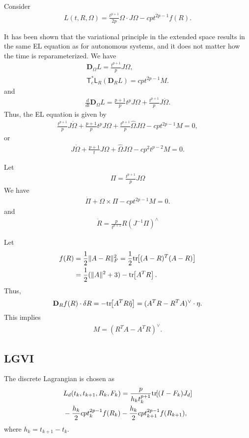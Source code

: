 \documentclass[letterpaper, 10pt, conference]{ieeeconf}
\newcommand{\bracket}[1]{\ensuremath{\left[ #1 \right]}}
\newcommand{\tr}[1]{\mbox{tr}\ensuremath{\negthickspace\bracket{#1}}}
\newcommand{\T}{\ensuremath{\mathsf{T}}}
\renewcommand{\L}{\ensuremath{\mathsf{L}}}
\newcommand{\D}{\ensuremath{\mathbf{D}}}
\begin{document}
Consider
\begin{align*}
    L(t,R,\Omega) = \frac{t^{p+1}}{2p} \Omega\cdot J\Omega - cpt^{2p-1} f(R).
\end{align*}

It has been shown that the variational principle in the extended space results in the same EL equation as for autonomous systems, and it does not matter how the time is reparameterized. 
We have
\begin{align*}
    \D_\Omega L = \frac{t^{p+1}}{p} J\Omega,\\
    \T^*_e \L_R( \D_R L) = cpt^{2p-1} M.
\end{align*}
and
\begin{align*}
    \frac{d}{dt} \D_\Omega L = \frac{p+1}{p} t^p J\Omega + \frac{t^{p+1}}{p} J\dot\Omega.
\end{align*}
Thus, the EL equation is given by
\begin{align*}
    \frac{t^{p+1}}{p} J\dot\Omega + \frac{p+1}{p} t^p J\Omega + \frac{t^{p+1}}{p} \hat\Omega J\Omega - cpt^{2p-1} M = 0,
\end{align*}
or
\begin{align*}
    J\dot\Omega + \frac{p+1}{t} J\Omega + \hat\Omega J\Omega - c p^2 t^{p-2} M = 0.
\end{align*}

Let
\begin{align*}
\Pi = \frac{t^{p+1}}{p} J\Omega
\end{align*}
We have
\begin{align*}
    \dot \Pi + \Omega\times \Pi - cpt^{2p-1} M = 0.
\end{align*}
and
\begin{align*}
    \dot R = \frac{p}{t^{p+1}} R (J^{-1}\Pi)^\wedge
\end{align*}


Let 
\begin{align*}
    f(R) & = \frac{1}{2}\| A- R\|^2_F = \frac{1}{2} \tr{(A-R)^T(A-R)}  \\
         & =\frac{1}{2}(\|A\|^2 + 3) - \tr{A^T R}.
\end{align*}
Thus,
\begin{align*}
    \D_R f(R) \cdot \delta R = -\tr{A^T R\hat\eta} = (A^T R- R^T A)^\vee \cdot \eta.
\end{align*}
This implies
\begin{align*}
    M = (R^T A-A^T R)^\vee.
\end{align*}

\subsection{LGVI}
The discrete Lagrangian is chosen as
\begin{align*}
    & L_d(t_k, t_{k+1}, R_k, F_k) = \frac{p}{h_k t_k^{p+1}} \tr{(I-F_k)J_d}\\
    &- \frac{h_k}{2}c p t_k^{2p-1} f(R_k) - \frac{h_k}{2}c p t_{k+1}^{2p-1} f(R_{k+1}),
\end{align*}
where $h_k = t_{k+1}-t_k$.
\end{document}
